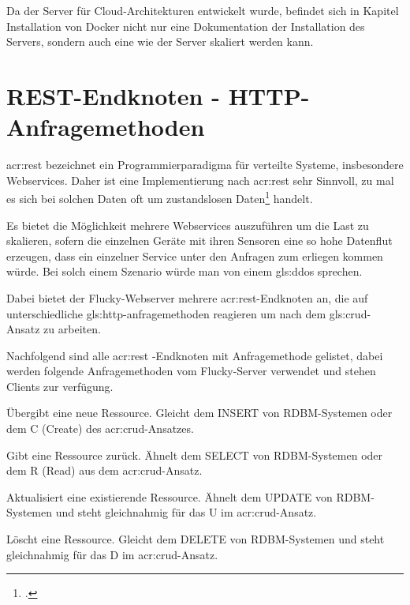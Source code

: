 Da der Server für Cloud-Architekturen entwickelt wurde, befindet sich in Kapitel Installation von Docker nicht nur eine Dokumentation der Installation des Servers, sondern auch eine wie der Server skaliert werden kann.

\section{REST-Endknoten - HTTP-Anfragemethoden}%
\label{sec:rest}
\acrfull{acr:rest} bezeichnet ein Programmierparadigma für verteilte Systeme, insbesondere Webservices. Daher ist eine Implementierung nach \acrshort{acr:rest} sehr Sinnvoll, zu mal es sich bei solchen Daten oft um zustandslosen Daten\footcite{zustandslosigkeit} handelt.

Es bietet die Möglichkeit mehrere Webservices auszuführen um die Last zu skalieren, sofern die einzelnen Geräte mit ihren Sensoren eine so hohe Datenflut erzeugen, dass ein einzelner Service unter den Anfragen zum erliegen kommen würde. Bei solch einem Szenario würde man von einem \Gls{gls:ddos} sprechen.

Dabei bietet der Flucky-Webserver mehrere \acrshort{acr:rest}-Endknoten an, die auf unterschiedliche \Gls{gls:http-anfragemethoden} reagieren um nach dem \Gls{gls:crud}-Ansatz zu arbeiten.

Nachfolgend sind alle \acrshort{acr:rest} -Endknoten mit Anfragemethode gelistet, dabei werden folgende Anfragemethoden vom Flucky-Server verwendet und stehen Clients zur verfügung.

\begin{description}[itemsep=0pt]
  \item[POST] Übergibt eine neue Ressource. Gleicht dem INSERT von RDBM-Systemen oder dem C (Create) des \acrshort{acr:crud}-Ansatzes.
  \item[GET] Gibt eine Ressource zurück. Ähnelt dem SELECT von RDBM-Systemen oder dem R (Read) aus dem \acrshort{acr:crud}-Ansatz.
  \item[PUT] Aktualisiert eine existierende Ressource. Ähnelt dem UPDATE von RDBM-Systemen und steht gleichnahmig für das U im \acrshort{acr:crud}-Ansatz.
  \item[DELETE] Löscht eine Ressource. Gleicht dem DELETE von RDBM-Systemen und steht gleichnahmig für das D im \acrshort{acr:crud}-Ansatz.
\end{description}

